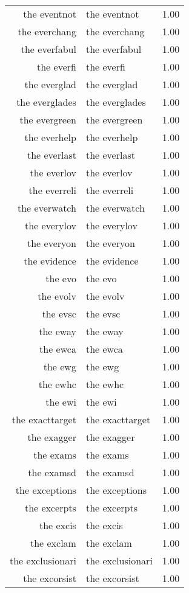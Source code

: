 \begin{table}[ht]
\begin{tabular}{rlr}
  the eventnot & the eventnot & 1.00 \\ 
  the everchang & the everchang & 1.00 \\ 
  the everfabul & the everfabul & 1.00 \\ 
  the everfi & the everfi & 1.00 \\ 
  the everglad & the everglad & 1.00 \\ 
  the everglades & the everglades & 1.00 \\ 
  the evergreen & the evergreen & 1.00 \\ 
  the everhelp & the everhelp & 1.00 \\ 
  the everlast & the everlast & 1.00 \\ 
  the everlov & the everlov & 1.00 \\ 
  the everreli & the everreli & 1.00 \\ 
  the everwatch & the everwatch & 1.00 \\ 
  the everylov & the everylov & 1.00 \\ 
  the everyon & the everyon & 1.00 \\ 
  the evidence & the evidence & 1.00 \\ 
  the evo & the evo & 1.00 \\ 
  the evolv & the evolv & 1.00 \\ 
  the evsc & the evsc & 1.00 \\ 
  the eway & the eway & 1.00 \\ 
  the ewca & the ewca & 1.00 \\ 
  the ewg & the ewg & 1.00 \\ 
  the ewhc & the ewhc & 1.00 \\ 
  the ewi & the ewi & 1.00 \\ 
  the exacttarget & the exacttarget & 1.00 \\ 
  the exagger & the exagger & 1.00 \\ 
  the exams & the exams & 1.00 \\ 
  the examsd & the examsd & 1.00 \\ 
  the exceptions & the exceptions & 1.00 \\ 
  the excerpts & the excerpts & 1.00 \\ 
  the excis & the excis & 1.00 \\ 
  the exclam & the exclam & 1.00 \\ 
  the exclusionari & the exclusionari & 1.00 \\ 
  the excorsist & the excorsist & 1.00 \\ 

\end{tabular}
\end{table}

